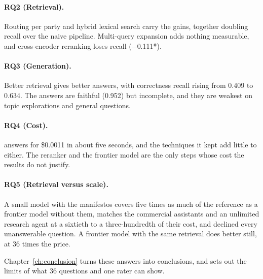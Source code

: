 \paragraph{RQ2 (Retrieval).} Routing per party and hybrid lexical search carry
the gains, together doubling recall over the naive pipeline. Multi-query
expansion adds nothing measurable, and cross-encoder reranking loses recall
($-$0.111*).

\paragraph{RQ3 (Generation).} Better retrieval gives better answers, with
correctness recall rising from 0.409 to 0.634. The answers are faithful
(0.952) but incomplete, and they are weakest on topic explorations and general
questions.

\paragraph{RQ4 (Cost).} \sysname{} answers for \$0.0011 in about five seconds, and the techniques it kept add little to either. The reranker
and the frontier model are the only steps whose cost the results do not
justify.

\paragraph{RQ5 (Retrieval versus scale).} A small model with the manifestos
covers five times as much of the reference as a frontier model without them,
matches the commercial assistants and an unlimited research agent at a
sixtieth to a three-hundredth of their cost, and declined every unanswerable
question. A frontier model with the same
retrieval does better still, at 36 times the price.

Chapter~\ref{ch:conclusion} turns these answers into conclusions, and sets
out the limits of what 36 questions and one rater can show.
